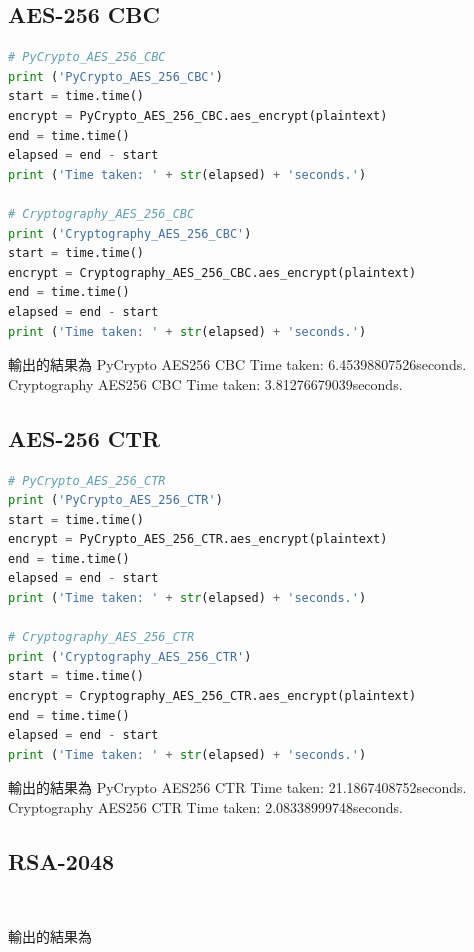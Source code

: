\documentclass[12pt,a4paper]{article}
\begin{document}
\subsection{AES-256 CBC}
{
\begin{lstlisting}[language=Python]
# PyCrypto_AES_256_CBC
print ('PyCrypto_AES_256_CBC')
start = time.time()
encrypt = PyCrypto_AES_256_CBC.aes_encrypt(plaintext)
end = time.time()
elapsed = end - start
print ('Time taken: ' + str(elapsed) + 'seconds.')

# Cryptography_AES_256_CBC
print ('Cryptography_AES_256_CBC')
start = time.time()
encrypt = Cryptography_AES_256_CBC.aes_encrypt(plaintext)
end = time.time()
elapsed = end - start
print ('Time taken: ' + str(elapsed) + 'seconds.')
\end{lstlisting}
輸出的結果為
\newline PyCrypto AES256 CBC
Time taken: 6.45398807526seconds.
\newline Cryptography AES256 CBC
Time taken: 3.81276679039seconds.
}

\subsection{AES-256 CTR}
{
\begin{lstlisting}[language=Python]
# PyCrypto_AES_256_CTR
print ('PyCrypto_AES_256_CTR')
start = time.time()
encrypt = PyCrypto_AES_256_CTR.aes_encrypt(plaintext)
end = time.time()
elapsed = end - start
print ('Time taken: ' + str(elapsed) + 'seconds.')

# Cryptography_AES_256_CTR
print ('Cryptography_AES_256_CTR')
start = time.time()
encrypt = Cryptography_AES_256_CTR.aes_encrypt(plaintext)
end = time.time()
elapsed = end - start
print ('Time taken: ' + str(elapsed) + 'seconds.')
\end{lstlisting}
輸出的結果為
\newline PyCrypto AES256 CTR
Time taken: 21.1867408752seconds.
\newline Cryptography AES256 CTR
Time taken: 2.08338999748seconds.
}

\subsection{RSA-2048}
{
\begin{lstlisting}[language=Python]
	
\end{lstlisting}
輸出的結果為
}
\end{document}
